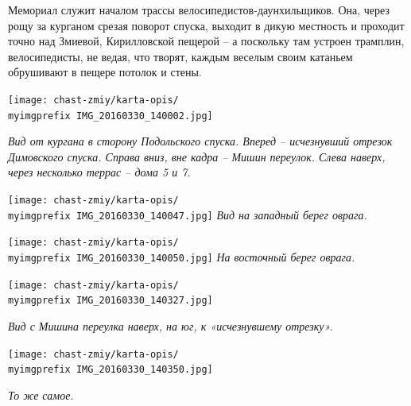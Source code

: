 
Мемориал служит началом трассы велосипедистов-да\-ун\-хильщиков. Она, через рощу за курганом срезая поворот спуска, выходит в дикую местность и проходит точно над Змиевой, Кирилловской пещерой – а поскольку там устроен трамплин, велосипедисты, не ведая, что творят, каждым веселым своим катаньем обрушивают в пещере потолок и стены.

\vspace*{\fill}

\begin{center}
\texttt{[image: chast-zmiy/karta-opis/\\myimgprefix IMG\_20160330\_140002.jpg]}

\textit{Вид от кургана в сторону Подольского спуска. Вперед – исчезнувший отрезок Димовского спуска. Справа вниз, вне кадра – Мишин переулок. Слева наверх, через несколько террас – дома 5 и 7.}
\end{center}

\vspace*{\fill}


\newpage
\begin{center}
\texttt{[image: chast-zmiy/karta-opis/\\myimgprefix IMG\_20160330\_140047.jpg]}
\textit{Вид на западный берег оврага.}
\end{center}

\begin{center}
\texttt{[image: chast-zmiy/karta-opis/\\myimgprefix IMG\_20160330\_140050.jpg]}
\textit{На восточный берег оврага.}
\end{center}
\newpage

\begin{center}
\texttt{[image: chast-zmiy/karta-opis/\\myimgprefix IMG\_20160330\_140327.jpg]}

\textit{Вид с Мишина переулка наверх, на юг, к «исчезнувшему отрезку».}
\end{center}

\begin{center}
\texttt{[image: chast-zmiy/karta-opis/\\myimgprefix IMG\_20160330\_140350.jpg]}

\textit{То же самое.}
\end{center}
\newpage

